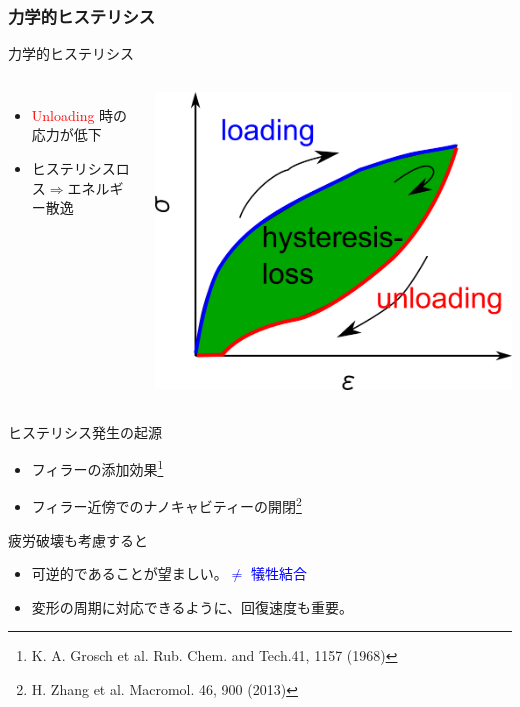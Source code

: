 \documentclass[12pt, dvipdfmx]{beamer}
\begin{document}
\begin{frame}
	\frametitle{力学的ヒステリシス}
		\vspace{-2mm}
		\begin{exampleblock}{力学的ヒステリシス}
			\begin{columns}[totalwidth=\textwidth]
					\begin{itemize}
						\item
						\textcolor{red}{Unloading} 時の応力が低下
						\item
						ヒステリシスロス$\Rightarrow$エネルギー散逸
					\end{itemize}
					\centering
					\includegraphics[width=.6\textwidth]{hysteresis_curve.png}
			\end{columns}
			\end{exampleblock}
			\vspace{-2mm}
			\begin{block}{ヒステリシス発生の起源}
				\begin{itemize}
					\item フィラーの添加効果\footnote{
						\scriptsize{K. A. Grosch et al. Rub. Chem. and Tech.41, 1157 (1968)}
					}
					\item フィラー近傍でのナノキャビティーの開閉\footnote{
						\scriptsize{H. Zhang et al. Macromol. 46, 900 (2013)}
					}
				\end{itemize}
			\end{block}
			\vspace{-2mm}
			\begin{alertblock}{疲労破壊も考慮すると}
				\begin{itemize}
					\item \alert{可逆的}であることが望ましい。\textcolor{blue}{$\neq$ 犠牲結合}
					\item 変形の周期に対応できるように、\alert{回復速度}も重要。
				\end{itemize}
			\end{alertblock}
\end{frame}
\end{document}
